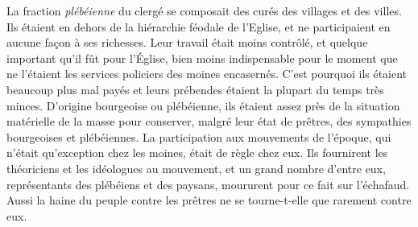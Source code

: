 \documentclass[french,twoside]{book} %
\begin{document}
La fraction \emph{plébéienne} du clergé se composait des curés des villages et des villes. Ils étaient en dehors de la hiérarchie féodale de l’Eglise, et ne participaient en aucune façon à ses richesses. Leur travail était moins contrôlé, et quelque important qu’il fût pour l’Église, bien moins indispensable pour le moment que ne l’étaient les services policiers des moines encasernés. C’est pourquoi ils étaient beaucoup plus mal payés et leurs prébendes étaient la plupart du temps très minces. D’origine bourgeoise ou plébéienne, ils étaient assez près de la situation matérielle de la masse pour conserver, malgré leur état de prêtres, des sympathies bourgeoises et plébéiennes. La participation aux mouvements de l’époque, qui n’était qu’exception chez les moines, était de règle chez eux. Ils fournirent les théoriciens et les idéologues au mouvement, et un grand nombre d’entre eux, représentants des plébéiens et des paysans, moururent pour ce fait sur l’échafaud. Aussi la haine du peuple contre les prêtres ne se tourne-t-elle que rarement contre eux.\par
\end{document}
